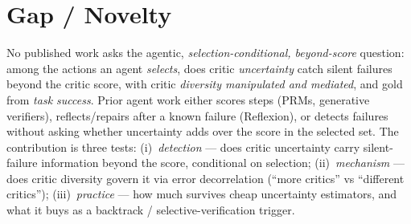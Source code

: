\documentclass[11pt]{article}
\begin{document}
\section{Gap / Novelty}
No published work asks the agentic, \emph{selection-conditional, beyond-score}
question: among the actions an agent \emph{selects}, does critic \emph{uncertainty}
catch silent failures beyond the critic score, with critic \emph{diversity
manipulated and mediated}, and gold from \emph{task success}. Prior agent work
either scores steps (PRMs, generative verifiers), reflects/repairs after a known
failure (Reflexion), or detects failures without asking whether uncertainty adds
over the score in the selected set. The contribution is three tests:
(i)~\emph{detection} --- does critic uncertainty carry silent-failure information
beyond the score, conditional on selection; (ii)~\emph{mechanism} --- does critic
diversity govern it via error decorrelation (``more critics'' vs ``different
critics''); (iii)~\emph{practice} --- how much survives cheap uncertainty
estimators, and what it buys as a backtrack / selective-verification trigger.
\end{document}
